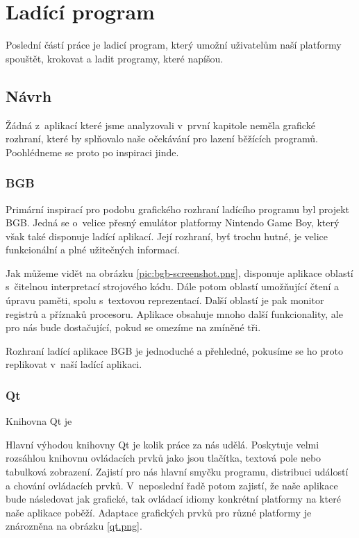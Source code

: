 \chapter{Ladící program}
\label{chap:debugger}

Poslední částí práce je ladicí program, který umožní uživatelům naší platformy spouštět, krokovat a ladit programy, které napíšou.

\section{Návrh}

Žádná z~aplikací které jsme analyzovali v~první kapitole neměla grafické rozhraní, které by splňovalo naše očekávání pro lazení běžících programů. Poohlédneme se proto po inspiraci jinde.

\subsection{BGB}

Primární inspirací pro podobu grafického rozhraní ladícího programu byl projekt BGB. Jedná se o~velice přesný emulátor platformy Nintendo Game Boy\cite{bgb-website}, který však také disponuje ladící aplikací. Její rozhraní, byť trochu hutné, je velice funkcionální a plné užitečných informací.


Jak můžeme vidět na obrázku \ref{pic:bgb-screenshot.png}, disponuje aplikace oblastí s~čitelnou interpretací strojového kódu. Dále potom oblastí umožňující čtení a úpravu paměti, spolu s~textovou reprezentací. Další oblastí je pak monitor registrů a příznaků procesoru. Aplikace obsahuje mnoho další funkcionality, ale pro nás bude dostačující, pokud se omezíme na zmíněné tři.

Rozhraní ladící aplikace BGB je jednoduché a přehledné, pokusíme se ho proto replikovat v~naší ladící aplikaci.

\subsection{Qt}
\label{sec:dbg-qt}

Knihovna Qt je 

Hlavní výhodou knihovny Qt je kolik práce za nás udělá. Poskytuje velmi rozsáhlou knihovnu ovládacích prvků jako jsou tlačítka, textová pole nebo tabulková zobrazení. Zajistí pro nás hlavní smyčku programu, distribuci událostí a chování ovládacích prvků. V~neposlední řadě potom zajistí, že naše aplikace bude následovat jak grafické, tak ovládací idiomy konkrétní platformy na které naše aplikace poběží. Adaptace grafických prvků pro různé platformy je znározněna na obrázku \ref{qt.png}.

